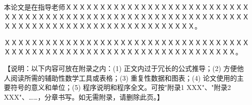 \documentclass[a4paper]{ltxdoc}
\begin{document}
\begin{thank}
本论文是在指导老师ＸＸＸＸＸＸＸＸＸＸＸＸＸＸＸＸＸＸＸＸＸＸＸＸＸＸＸＸＸＸＸＸＸＸＸＸＸＸＸＸＸＸＸＸＸＸＸＸＸＸＸＸＸＸＸＸＸＸＸＸＸＸＸＸＸＸＸＸＸＸＸＸＸＸＸＸＸＸＸＸＸＸＸＸＸＸＸＸＸＸＸ。

ＸＸＸＸＸＸＸＸＸＸＸＸＸＸＸＸＸＸＸＸＸＸＸＸＸＸＸＸＸＸＸＸＸＸＸＸＸＸＸＸＸＸＸＸＸＸＸＸＸＸＸＸＸＸＸＸＸＸＸＸＸＸＸＸＸＸＸＸＸＸ。
\end{thank}

\begin{appendix}
【说明：以下内容可放在附录之内：(1) 正文内过于冗长的公式推导；(2) 方便他人阅读所需的辅助性数学工具或表格；(3) 重复性数据和图表；(4) 论文使用的主要符号的意义和单位；(5) 程序说明和程序全文。可按"附录1  XXX"、"附录2  XXX"、……，分章书写。如无需附录，请删除此页。】
\end{appendix}
\end{document}
